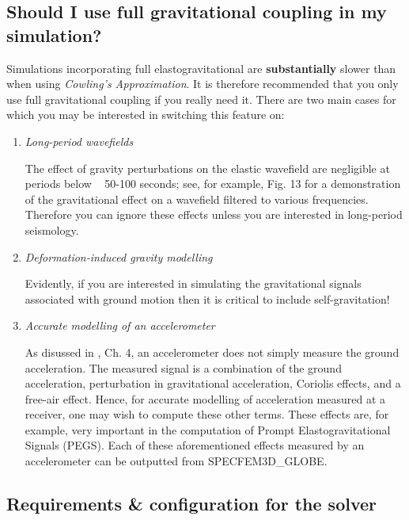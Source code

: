 \subsection{Should I use full gravitational coupling in my simulation?}
 
 Simulations incorporating full elastogravitational are \textbf{substantially} slower than when using \textit{Cowling's Approximation}. 
 It is therefore recommended that you only use full gravitational coupling if you really need it. There are two main cases
 for which you may be interested in switching this feature on: 
 
 \begin{enumerate}

 \item \textit{ Long-period wavefields}

 The effect of gravity perturbations on the elastic wavefield are negligible at periods below ~ 50-100 seconds; see, for 
 example, \cite{GhEaTr23} Fig. 13 for a demonstration of the gravitational effect on a wavefield filtered to various 
 frequencies. Therefore you can ignore these effects unless you are interested in long-period seismology.
 
 \item \textit{ Deformation-induced gravity modelling}

 Evidently, if you are interested in simulating the gravitational signals associated with ground motion then it is critical
 to include self-gravitation! 
 
 \item \textit{ Accurate modelling of an accelerometer} 

 As disussed in \cite{DaTr98}, Ch. 4, an accelerometer does not simply measure the ground acceleration. The measured signal 
 is a combination of the ground acceleration, perturbation in gravitational acceleration, Coriolis effects, and a free-air effect. 
 Hence, for accurate modelling of acceleration measured at a receiver, one may wish to compute these other terms. These 
 effects are, for example, very important in the computation of Prompt Elastogravitational Signals (PEGS). Each of these aforementioned 
 effects measured by an accelerometer can be outputted from SPECFEM3D\_GLOBE.

\end{enumerate} 



\subsection{Requirements \& configuration for the solver}
 
